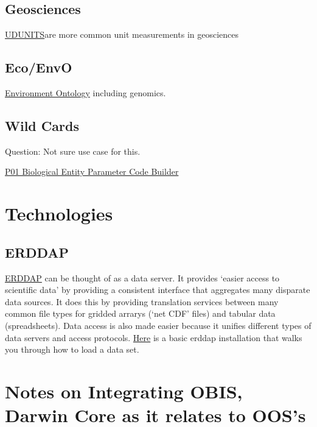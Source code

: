 \documentclass[
]{book}
\begin{document}
\hypertarget{geosciences}{%
\subsection{Geosciences}\label{geosciences}}

\href{https://www.unidata.ucar.edu/software/udunits/}{UDUNITS}are more common unit measurements in geosciences

\hypertarget{ecoenvo}{%
\subsection{Eco/EnvO}\label{ecoenvo}}

\href{http://www.obofoundry.org/ontology/envo.html}{Environment Ontology} including genomics.

\hypertarget{wild-cards}{%
\subsection{Wild Cards}\label{wild-cards}}

Question: Not sure use case for this.

\href{https://www.bodc.ac.uk/resources/vocabularies/vocabulary_builder/biomodel/}{P01 Biological Entity Parameter Code Builder}

\hypertarget{technologies}{%
\section{Technologies}\label{technologies}}

\hypertarget{erddap}{%
\subsection{ERDDAP}\label{erddap}}

\href{https://coastwatch.pfeg.noaa.gov/erddap/index.html}{ERDDAP} can be thought of as a data server. It provides `easier access to scientific data' by providing a consistent interface that aggregates many disparate data sources. It does this by providing translation services between many common file types for gridded arrarys (`net CDF' files) and tabular data (spreadsheets). Data access is also made easier because it unifies different types of data servers and access protocols. \href{https://github.com/HakaiInstitute/erddap-basic}{Here} is a basic erddap installation that walks you through how to load a data set.

\hypertarget{notes-on-integrating-obis-darwin-core-as-it-relates-to-ooss}{%
\section{Notes on Integrating OBIS, Darwin Core as it relates to OOS's}\label{notes-on-integrating-obis-darwin-core-as-it-relates-to-ooss}}
\end{document}
